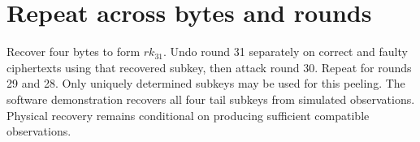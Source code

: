 \section{Repeat across bytes and rounds}
Recover four bytes to form $rk_{31}$. Undo round 31 separately on correct and faulty ciphertexts using that recovered subkey, then attack round 30. Repeat for rounds 29 and 28. Only uniquely determined subkeys may be used for this peeling.
The software demonstration recovers all four tail subkeys from simulated observations. Physical recovery remains conditional on producing sufficient compatible observations.
